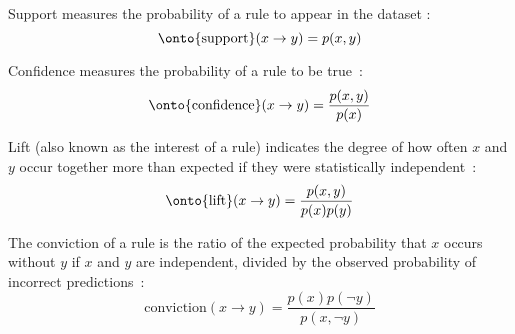 \begin{definition}
Support measures the probability of a rule to appear in the dataset \citep{Wiley2014}:
\[\text{\onto{support}}(x \rightarrow y) = p(x,y)\]
\end{definition}

\begin{definition} %
Confidence measures the  probability of a rule to be true~\citep{Wiley2014}:
\[\text{\onto{confidence}}(x \rightarrow y) = \frac{p(x,y)}{p(x)}\]
\end{definition}

\begin{definition}
Lift (also known as the interest of a rule) indicates the degree of how often $x$ and $y$ occur together 
more than expected if they were statistically independent~\citep{Wiley2014}:
\[\text{\onto{lift}}(x \rightarrow y) = \frac{p(x,y)}{ p(x) p(y)}\]
\end{definition}

\begin{definition}
The conviction of a rule is the ratio of the expected probability that $x$ occurs without $y$ if $x$ and $y$ are independent, divided by the observed probability of incorrect predictions~\citep{Brin97}:
\[\text{conviction}(x \rightarrow y) = \frac{p(x) p(\neg y)}{p(x, \neg y)}\]
\end{definition}


